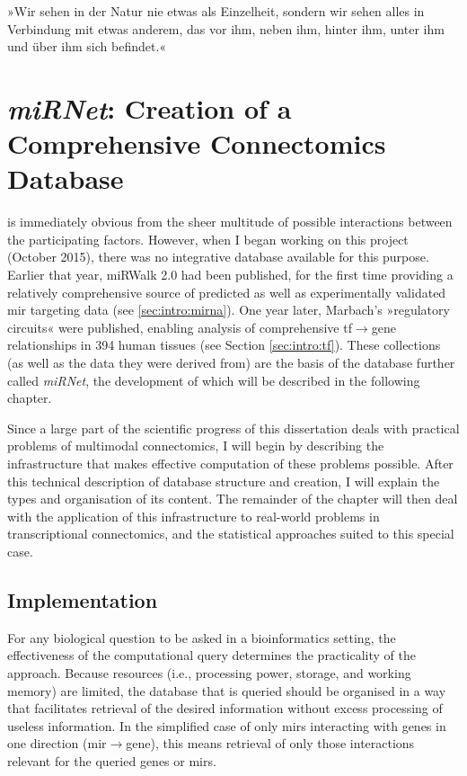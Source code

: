 \begin{savequote}[75mm]
»Wir sehen in der Natur nie etwas als Einzelheit, sondern wir sehen alles in Verbindung mit etwas anderem, das vor ihm, neben ihm, hinter ihm, unter ihm und über ihm sich befindet.«
\end{savequote}

\chapter[miRNet: Creation of a Comprehensive Connectomics Database]{\textit{miRNet}: Creation of a\\Comprehensive Connectomics Database} \label{sec:database:mirnet}
 is immediately obvious from the sheer multitude of possible interactions between the participating factors. However, when I began working on this project (October 2015), there was no integrative database available for this purpose. Earlier that year, miRWalk 2.0 had been published, for the first time providing a relatively comprehensive source of predicted as well as experimentally validated \ac{mir} targeting data\cite{Dweep2015} (see \ref{sec:intro:mirna}). One year later, Marbach's »regulatory circuits« were published\cite{Marbach2016}, enabling analysis of comprehensive \ac{tf}$\to$gene relationships in 394 human tissues (see Section \ref{sec:intro:tf}). These collections (as well as the data they were derived from) are the basis of the database further called \textit{miRNet}, the development of which will be described in the following chapter.

Since a large part of the scientific progress of this dissertation deals with practical problems of multimodal connectomics, I will begin by describing the infrastructure that makes effective computation of these problems possible. After this technical description of database structure and creation, I will explain the types and organisation of its content. The remainder of the chapter will then deal with the application of this infrastructure to real-world problems in transcriptional connectomics, and the statistical approaches suited to this special case.

\section{Implementation}
For any biological question to be asked in a bioinformatics setting, the effectiveness of the computational query determines the practicality of the approach. Because resources (i.e., processing power, storage, and working memory) are limited, the database that is queried should be organised in a way that facilitates retrieval of the desired information without excess processing of useless information. In the simplified case of only \acp{mir} interacting with genes in one direction (\ac{mir}$\to$gene), this means retrieval of only those interactions relevant for the queried genes or \acp{mir}. 


